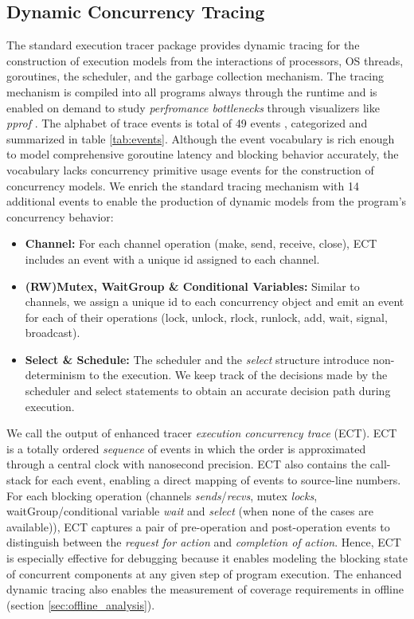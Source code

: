 \subsection{Dynamic Concurrency Tracing}
\label{sec:dynamic_tracing}
The standard execution tracer package \cite{go-package-trace,go-cmd-trace} provides dynamic tracing for the construction of execution models from the interactions of processors, OS threads, goroutines, the scheduler, and the garbage collection mechanism.
%
The tracing mechanism is compiled into all programs always through the runtime and is enabled on demand to study \textit{perfromance bottlenecks} through visualizers like \textit{pprof} \cite{go-profile-blog}.
%
The alphabet of trace events is total of 49 events \cite{goParserSource}, categorized and summarized in table \ref{tab:events}.
%
Although the event vocabulary is rich enough to model comprehensive goroutine latency and blocking behavior accurately,
the vocabulary lacks concurrency primitive usage events for the construction of concurrency models.
%
We enrich the standard tracing mechanism with 14 additional events to enable the production of dynamic models from the program's concurrency behavior:
\begin{itemize}
    \item \textbf{Channel:} For each channel operation (make, send, receive, close), ECT includes an event with a unique id assigned to each channel.
    \item \textbf{(RW)Mutex, WaitGroup \& Conditional Variables:} Similar to channels, we assign a unique id to each concurrency object and emit an event for each of their operations (lock, unlock, rlock, runlock, add, wait, signal, broadcast).
    \item \textbf{Select \& Schedule:} The scheduler and the \textit{select} structure introduce non-determinism to the execution. We keep track of the decisions made by the scheduler and select statements to obtain an accurate decision path during execution.
\end{itemize}

We call the output of enhanced tracer \textit{execution concurrency trace} (ECT).
%
ECT is a totally ordered \textit{sequence} of events in which the order is approximated through a central clock with nanosecond precision.
%
ECT also contains the call-stack for each event, enabling a direct mapping of events to source-line numbers.
%
For each blocking operation (channels \textit{sends}/\textit{recvs}, mutex \textit{locks}, waitGroup/conditional variable \textit{wait} and \textit{select} (when none of the cases are available)), ECT captures a pair of pre-operation and post-operation events to distinguish between the \textit{request for action} and \textit{completion of action}.
%
Hence, ECT is especially effective for debugging because it enables modeling the blocking state of concurrent components at any given step of program execution.
%
The enhanced dynamic tracing also enables the measurement of coverage requirements in offline (section \ref{sec:offline_analysis}).

